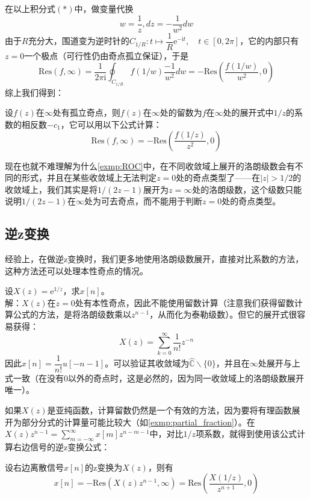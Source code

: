 在以上积分式$(*)$中，做变量代换$$w=\frac{1}{z},dz=-\dfrac{1}{w^2}dw$$
由于$R$充分大，围道变为逆时针的$C_{1/R}:t\mapsto \dfrac{1}{R}\mathrm{e}^{-\mathrm{i}t},\quad t\in[0,2\pi]$，它的内部只有$z=0$一个极点（可行性仍由奇点孤立保证），于是
\[\mathrm{Res}(f,\infty)=\frac{1}{2\pi \mathrm{i}}\oint_{C_{1/R}}f(1/w)\frac{-1}{w^2}dw=-\mathrm{Res}\left(\frac{f(1/w)}{w^2},0\right)\]
综上我们得到：
\begin{proposition}[无穷远点的留数]
    设$f(z)$在$\infty$处有孤立奇点，则$f(z)$在$\infty$处的留数为$f$在$\infty$处的展开式中$1/z$的系数的相反数$-c_{1}$，它可以用以下公式计算：
    \[\mathrm{Res}(f,\infty)=-\mathrm{Res}\left(\frac{f(1/z)}{z^2},0\right)\]
\end{proposition}

现在也就不难理解为什么\cref{exmp:ROC}中，在不同收敛域上展开的洛朗级数会有不同的形式，并且在某些收敛域上无法判定$z=0$处的奇点类型了——在$|z|>1/2$的收敛域上，我们其实是将$1/(2z-1)$展开为$z=\infty$处的洛朗级数，这个级数只能说明$1/(2z-1)$在$\infty$处为可去奇点，而不能用于判断$z=0$处的奇点类型。

\subsection{逆z变换}\label{sub:z_inverse}
经验上，在做逆z变换时，我们更多地使用洛朗级数展开，直接对比系数的方法，这种方法还可以处理本性奇点的情况。
\begin{example}
    设$X(z)=\mathrm{e}^{1/z}$，求$x[n]$。\\
    解：$X(z)$在$z=0$处有本性奇点，因此不能使用留数计算（注意我们获得留数计算公式的方法，是将洛朗级数乘以$z^{n-1}$，从而化为泰勒级数）。但它的展开式很容易获得：
    \[X(z)=\sum_{k=0}^{\infty}\frac{1}{n!}z^{-n}\]
    因此$x[n]=\dfrac{1}{n!}u[-n-1]$。可以验证其收敛域为$\hat{\mathbb{C}}\backslash\{0\}$，并且在$\infty$处展开与上式一致（在没有$0$以外的奇点时，这是必然的，因为同一收敛域上的洛朗级数展开唯一）。
\end{example}

如果$X(z)$是亚纯函数，计算留数仍然是一个有效的方法，因为要将有理函数展开为部分分式的计算量可能比较大（如\cref{exmp:partial_fraction}）。在$X(z)z^{n-1}=\sum_{m=-\infty}^{\infty}x[m]z^{n-m-1}$中，对比$1/z$项系数，就得到使用该公式计算右边信号的逆z变换公式：
\begin{theorem}
    设右边离散信号$x[n]$的z变换为$X(z)$，则有
    \[x[n]=-\mathrm{Res}\left(X(z)z^{n-1},\infty\right)=\mathrm{Res}\left(\frac{X(1/z)}{z^{n+1}},0\right)\]
\end{theorem}


